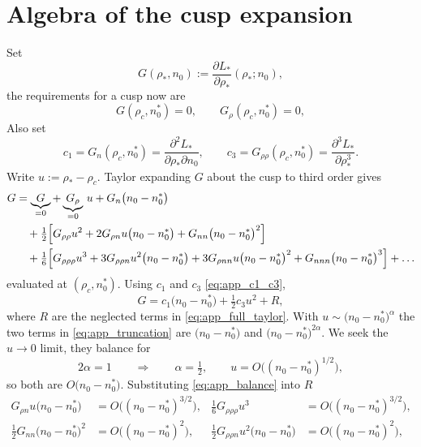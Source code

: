 \documentclass[11pt,a4paper]{report}
\newcommand{\pd}{\partial}
\begin{document}
\section{Algebra of the cusp expansion}
\label{app:cusp_algebra}
Set
\begin{equation}
	G(\rho_*,n_0):=\frac{\pd L_*}{\pd\rho_*}(\rho_*;n_0),
	\label{eq:app_G_def}
\end{equation}
the requirements for a cusp now are
\begin{equation}
	G(\rho_c,n_0^{*})=0,
	\qquad
	G_\rho(\rho_c,n_0^{*})=0,
	\label{eq:app_cusp_conditions}
\end{equation}
Also set
\begin{equation}
	c_1=G_n(\rho_c,n_0^{*})=\frac{\pd^2L_*}{\pd\rho_*\pd n_0},
	\qquad
	c_3=G_{\rho\rho}(\rho_c,n_0^{*})=\frac{\pd^3L_*}{\pd\rho_*^3}.
	\label{eq:app_c1_c3}
\end{equation}
Write $u:=\rho_*-\rho_c$. Taylor expanding $G$ about the cusp to third order gives
\begin{align}
	G&=\underbrace{G}_{=0}
	+\underbrace{G_\rho}_{=0}\,u+G_n\bigl(n_0-n_0^{*}\bigr)
	\nonumber\\
	&\quad+\tfrac12\Bigl[G_{\rho\rho}u^2+2G_{\rho n}u\bigl(n_0-n_0^{*}\bigr)
	+G_{nn}\bigl(n_0-n_0^{*}\bigr)^2\Bigr]
	\nonumber\\
	&\quad+\tfrac16\Bigl[G_{\rho\rho\rho}u^3+3G_{\rho\rho n}u^2\bigl(n_0-n_0^{*}\bigr)
	+3G_{\rho nn}u\bigl(n_0-n_0^{*}\bigr)^2+G_{nnn}\bigl(n_0-n_0^{*}\bigr)^3\Bigr]
	+\dots
	\label{eq:app_full_taylor}
\end{align}
evaluated at $(\rho_c,n_0^{*})$. Using $c_1$ and $c_3$ \eqref{eq:app_c1_c3},
\begin{equation}
	G=c_1\bigl(n_0-n_0^{*}\bigr)+\tfrac12c_3u^2+R,
	\label{eq:app_truncation}
\end{equation}
where $R$ are the neglected terms in \eqref{eq:app_full_taylor}.
With $u\sim\bigl(n_0-n_0^{*}\bigr)^{\alpha}$ the two terms in
\eqref{eq:app_truncation} are $\bigl(n_0-n_0^{*}\bigr)$ and
$\bigl(n_0-n_0^{*}\bigr)^{2\alpha}$. We seek the $u\to0$ limit, they balance for
\begin{equation}
	2\alpha=1
	\qquad\Longrightarrow\qquad
	\alpha=\tfrac12,
	\qquad
	u=O\!\bigl((n_0-n_0^{*})^{1/2}\bigr),
	\label{eq:app_balance}
\end{equation}
so both are $O\bigl(n_0-n_0^{*}\bigr)$.
Substituting \eqref{eq:app_balance} into $R$
\begin{equation}
	\begin{aligned}
		G_{\rho n}u\bigl(n_0-n_0^{*}\bigr)&=O\!\bigl((n_0-n_0^{*})^{3/2}\bigr), &
		\tfrac16G_{\rho\rho\rho}u^3&=O\!\bigl((n_0-n_0^{*})^{3/2}\bigr),\\
		\tfrac12G_{nn}\bigl(n_0-n_0^{*}\bigr)^2&=O\!\bigl((n_0-n_0^{*})^{2}\bigr), &
		\tfrac12G_{\rho\rho n}u^2\bigl(n_0-n_0^{*}\bigr)&=O\!\bigl((n_0-n_0^{*})^{2}\bigr),
	\end{aligned}
	\label{eq:app_remainder_orders}
\end{equation}
\end{document}
